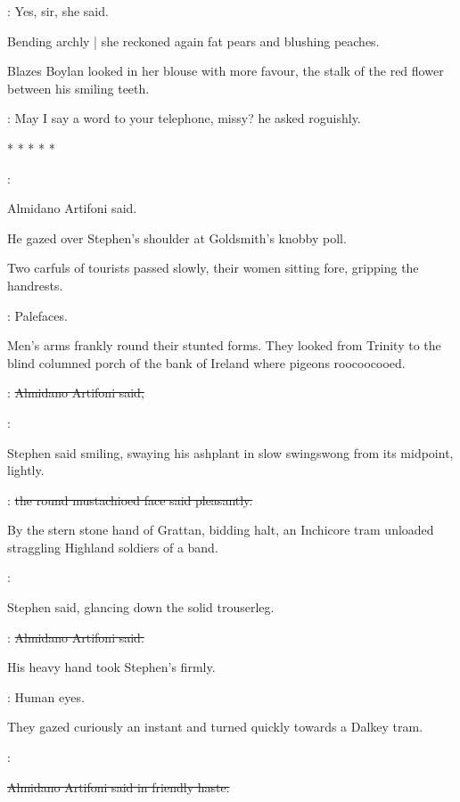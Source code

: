 \blondgirl:
Yes, sir,
she said.

Bending archly |
she reckoned again fat pears and blushing peaches.

Blazes Boylan looked in her blouse with more favour,
the stalk of the red flower between his smiling teeth.

\boylan:
May I say a word to your telephone, missy?
he asked roguishly.


    * * * * *


\artifoni:

Almidano Artifoni said.

He gazed over Stephen's shoulder at Goldsmith's knobby poll.

Two carfuls of tourists passed slowly,
their women sitting fore,
gripping the handrests.

\StephenInt:
Palefaces.

Men's arms frankly round their stunted forms.
They looked from Trinity
to the blind columned porch of the bank of Ireland
where pigeons roocoocooed.

\artifoni:
\sout{Almidano Artifoni said,}

\Stephen:

Stephen said smiling,
swaying his ashplant in slow swingswong from its midpoint,
lightly.

\artifoni:
\sout{the round mustachioed face said pleasantly.}

By the stern stone hand of Grattan,
bidding halt,
an Inchicore tram unloaded straggling Highland soldiers of a band.

\Stephen:

Stephen said,
glancing down the solid trouserleg.

\artifoni:
\sout{Almidano Artifoni said.}

His heavy hand took Stephen's firmly.

\StephenInt:
Human eyes.

They gazed curiously an instant and turned quickly towards a Dalkey tram.

\artifoni:

\sout{Almidano Artifoni said in friendly haste.}

